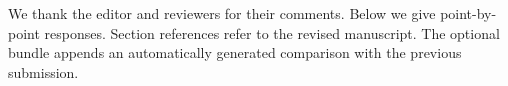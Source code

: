 We thank the editor and reviewers for their comments.
Below we give point-by-point responses. Section references refer to the revised manuscript.
The optional bundle appends an automatically generated comparison with the previous submission.
